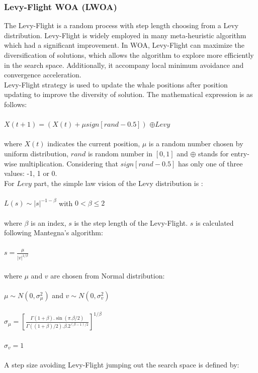 \documentclass[a4paper]{article}
\begin{document}
\subsubsection{Levy-Flight WOA (LWOA)}
The Levy-Flight is a random process with step length choosing from a Levy distribution. Levy-Flight is widely employed in many meta-heuristic algorithm which had a significant improvement. In WOA, Levy-Flight can maximize the diversification of solutions, which allows the algorithm to explore more efficiently in the search space. Additionally, it accompany local minimum avoidance and convergence acceleration. \\
Levy-Flight strategy is used to update the whale positions after position updating to improve the diversity of solution. The mathematical expression is as follows: \\ \\
$X(t+1) = (X(t) + \mu sign[rand - 0.5])$ $\oplus  Levy$ \\ \\
where $X(t)$ indicates the current position, $\mu$ is a random number chosen by uniform distribution, $rand$ is random number in $[0,1]$ and $\oplus$ stands for entry-wise multiplication. Considering that $sign[rand - 0.5]$ has only one of three values: -1, 1 or 0. \\
For $Levy$ part, the simple law vision of the Levy distribution is : \\ \\
$L(s) \sim |s|^{-1-\beta}$ with $0 < \beta \leq 2$ \\ \\
where $\beta$ is an index, $s$ is the step length of the Levy-Flight. $s$ is calculated following Mantegna’s algorithm: \\ \\
$s = \frac{\mu}{|v|^{1/\beta}}$ \\ \\
where $\mu$ and $v$ are chosen from Normal distribution: \\ \\
$\mu \sim N(0, \sigma _{\mu}^2)$ and $v \sim N(0, \sigma _{v}^2)$ \\ \\
$ \sigma _{\mu} = [\frac{\Gamma (1 + \beta).\sin (\pi .\beta/2)}{\Gamma ((1 + \beta)/2).\beta .2^{(\beta - 1)/2}}]^{1/\beta}$ \\ \\
$ \sigma _{v} = 1$ \\ \\
A step size avoiding Levy-Flight jumping out the search space is defined by: \\ \\
\end{document}

